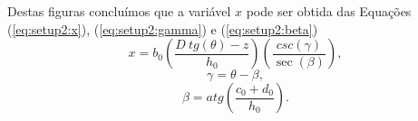 \documentclass[12pt]{article}
\begin{document}
Destas figuras concluímos que a variável $x$ pode ser obtida das Equações (\ref{eq:setup2:x}), 
 (\ref{eq:setup2:gamma}) e (\ref{eq:setup2:beta})
\begin{equation}\label{eq:setup2:x}
x=b_0\left(\frac{D~tg(\theta)-z}{h_0}\right)\left(\frac{csc\left({\gamma}\right) }{\sec\left(\beta\right)}\right),
\end{equation}
\begin{equation}\label{eq:setup2:gamma}
\gamma=\theta-\beta,
\end{equation}
\begin{equation}\label{eq:setup2:beta}
\beta=atg\left(\frac{c_0+d_0}{h_0}\right).
\end{equation}
\end{document}
